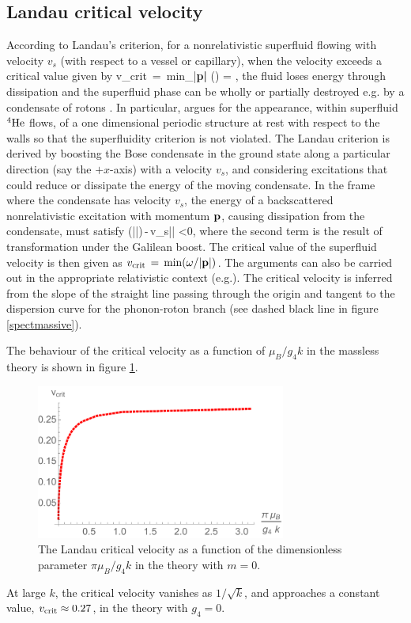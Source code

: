\subsection{Landau critical velocity}
According to Landau's criterion, for a nonrelativistic superfluid flowing with velocity $v_s$ (with respect to a vessel or capillary), when the velocity exceeds a critical value \cite{Schmitt:2014eka} given by 
\be
v_{\rm crit} \,=\, {\rm min}_{|\bf p|} \left(\frac{\omega(\p)}{|\p|}\right)\,\implies \frac{\partial \omega}{\partial |\p|}\,=\,\frac{\omega}{|\p|}\,,
\ee
the fluid loses energy through dissipation and the superfluid phase can be wholly or partially destroyed e.g. by a condensate of rotons \cite{pitaevskii84, voskresenskii93}. In particular, \cite{pitaevskii84} argues for the appearance, within superfluid ${}^4{\rm He}$ flows, of a one dimensional periodic structure at rest with  respect to the walls so that the superfluidity criterion is not violated. The Landau criterion is derived by boosting the Bose condensate in the ground state along a particular direction (say the $+x$-axis) with a velocity $v_s$, and considering excitations that could reduce or dissipate the energy of the moving condensate. In the frame where the condensate has velocity $v_s$, the energy of a backscattered nonrelativistic excitation with momentum ${\bf p}$, causing dissipation  from the condensate, must  satisfy
\be
\omega(|\p|)\,-\,v_s|\p| <0,
\ee
where the second term is the result of  transformation under  the Galilean boost.
The critical value of the superfluid velocity is then given as $v_{\rm crit}\,=\,{\rm min}(\omega/|{\bf p}|)$. The arguments can also be carried out in the appropriate relativistic context (e.g.\cite{voskresenskii93, Schmitt:2014eka}). The critical velocity is inferred from the slope of the straight line passing through the origin and tangent to the dispersion curve for the phonon-roton branch (see dashed black line in figure \ref{spectmassive}).

 The behaviour of the critical velocity as a function of $\mu_B/g_4 k$ in the massless theory is shown in figure \ref{vcrit}.
 \begin{figure}[h]
\begin{center}
\includegraphics[height=2.0in]{Chapter_3_Folder_1806.06976/figures/vcrit.pdf}
\end{center}
\caption{ \small{The Landau critical velocity as a function of the dimensionless parameter $\pi\mu_B/g_4 k$ in the theory with $m=0$.}}
\label{vcrit}
\end{figure}
 At large $k$, the critical velocity vanishes as $1/\sqrt{k}$, and approaches a constant value, $v_{\rm crit}\approx 0.27$, in the theory with $g_4=0$.
